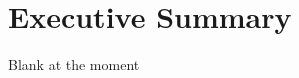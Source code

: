 \documentclass[11pt, a4paper, oneside]{report} %
\begin{document}















\chapter*{Executive Summary}

Blank at the moment

\end{document}
